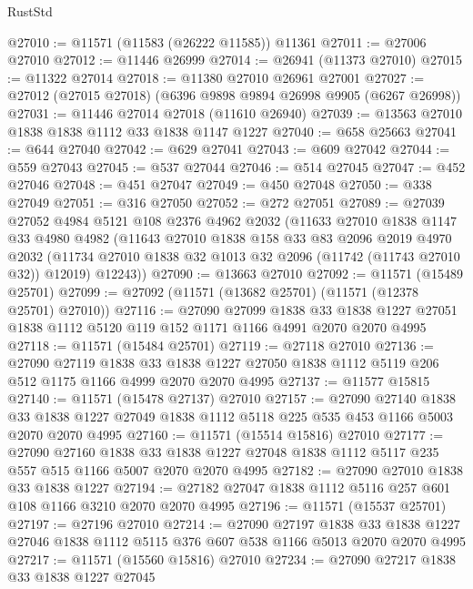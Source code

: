 \begin{lexlean}{RustStd}
\begin{coremodule}
@27010 := @11571 (@11583 (@26222 @11585)) @11361
@27011 := @27006 @27010
@27012 := @11446 @26999
@27014 := @26941 (@11373 @27010)
@27015 := @11322 @27014
@27018 := @11380 @27010 @26961 @27001
@27027 := @27012 (@27015 @27018) (@6396 @9898 @9894 @26998 @9905 (@6267 @26998))
@27031 := @11446 @27014 @27018 (@11610 @26940)
@27039 := @13563 @27010 @1838 @1838 @1112 @33 @1838 @1147 @1227
@27040 := @658 @25663
@27041 := @644 @27040
@27042 := @629 @27041
@27043 := @609 @27042
@27044 := @559 @27043
@27045 := @537 @27044
@27046 := @514 @27045
@27047 := @452 @27046
@27048 := @451 @27047
@27049 := @450 @27048
@27050 := @338 @27049
@27051 := @316 @27050
@27052 := @272 @27051
@27089 := @27039
    @27052
    @4984
    @5121
    @108
    @2376
    @4962
    @2032
    (@11633
      @27010
      @1838
      @1147
      @33
      @4980
      @4982
      (@11643
        @27010
        @1838
        @158
        @33
        @83
        @2096
        @2019
        @4970
        @2032
        (@11734 @27010 @1838 @32 @1013 @32 @2096 (@11742 (@11743 @27010 @32)) @12019)
        @12243))
@27090 := @13663 @27010
@27092 := @11571 (@15489 @25701)
@27099 := @27092 (@11571 (@13682 @25701) (@11571 (@12378 @25701) @27010))
@27116 := @27090
    @27099
    @1838
    @33
    @1838
    @1227
    @27051
    @1838
    @1112
    @5120
    @119
    @152
    @1171
    @1166
    @4991
    @2070
    @2070
    @4995
@27118 := @11571 (@15484 @25701)
@27119 := @27118 @27010
@27136 := @27090
    @27119
    @1838
    @33
    @1838
    @1227
    @27050
    @1838
    @1112
    @5119
    @206
    @512
    @1175
    @1166
    @4999
    @2070
    @2070
    @4995
@27137 := @11577 @15815
@27140 := @11571 (@15478 @27137) @27010
@27157 := @27090
    @27140
    @1838
    @33
    @1838
    @1227
    @27049
    @1838
    @1112
    @5118
    @225
    @535
    @453
    @1166
    @5003
    @2070
    @2070
    @4995
@27160 := @11571 (@15514 @15816) @27010
@27177 := @27090
    @27160
    @1838
    @33
    @1838
    @1227
    @27048
    @1838
    @1112
    @5117
    @235
    @557
    @515
    @1166
    @5007
    @2070
    @2070
    @4995
@27182 := @27090 @27010 @1838 @33 @1838 @1227
@27194 := @27182 @27047 @1838 @1112 @5116 @257 @601 @108 @1166 @3210 @2070 @2070 @4995
@27196 := @11571 (@15537 @25701)
@27197 := @27196 @27010
@27214 := @27090
    @27197
    @1838
    @33
    @1838
    @1227
    @27046
    @1838
    @1112
    @5115
    @376
    @607
    @538
    @1166
    @5013
    @2070
    @2070
    @4995
@27217 := @11571 (@15560 @15816) @27010
@27234 := @27090
    @27217
    @1838
    @33
    @1838
    @1227
    @27045

\end{coremodule}
\end{lexlean}
